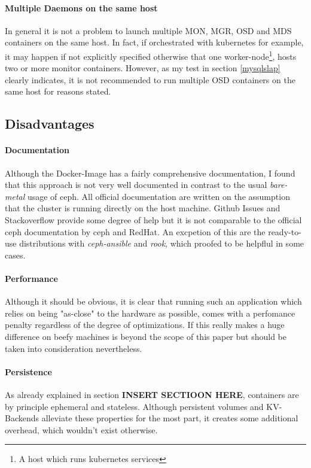 \documentclass[titlepage, a4paper, 11pt]{scrartcl}
\begin{document}
            \paragraph{Multiple Daemons on the same host} In general it is not a problem to launch multiple MON, MGR, OSD and MDS containers on the same host. In fact, if orchestrated with kubernetes for example, it may happen if not explicitly specified otherwise that one worker-node\footnote{A host which runs kubernetes services}, hosts two or more monitor containers. However, as my test in section \ref{mysqlslap} clearly indicates, it is not recommended to run multiple OSD containers on the same host for reasons stated.

        \subsection{Disadvantages}

            \paragraph{Documentation} Although the Docker-Image has a fairly comprehensive documentation, I found that this approach is not very well documented in contrast to the usual \textit{bare-metal} usage of ceph. All official documentation are written on the assumption that the cluster is running directly on the host machine. Github Issues and Stackoverflow provide some degree of help but it is not comparable to the official ceph documentation by ceph and RedHat. An excpetion of this are the ready-to-use distributions with \textit{ceph-ansible} and \textit{rook}, which proofed to be helpflul in some cases.

            \paragraph{Performance} Although it should be obvious, it is clear that running such an application which relies on being "as-close" to the hardware as possible, comes with a perfomance penalty regardless of the degree of optimizations. If this really makes a huge difference on beefy machines is beyond the scope of this paper but should be taken into consideration nevertheless. 

            \paragraph{Persistence} As already explained in section \textbf{INSERT SECTIOON HERE}, containers are by principle ephemeral and stateless. Although persistent volumes and KV-Backends alleviate these properties for the most part, it creates some additional overhead, which wouldn't exist otherwise.
\end{document}
